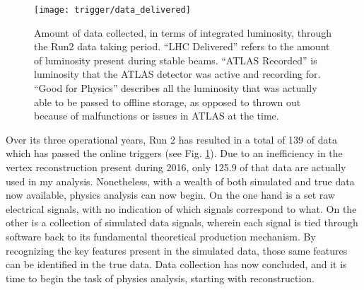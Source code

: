         \begin{figure}[h]
            \texttt{[image: trigger/data\_delivered]}
            \caption{Amount of data collected, in terms of integrated luminosity,
                through the Run2 data taking period\cite{data_quality}.
                ``LHC Delivered'' refers to the amount of luminosity present during stable beams.
                ``ATLAS Recorded'' is luminosity that the ATLAS detector was active and recording for.
                ``Good for Physics'' describes all the luminosity that was actually able to be passed to offline storage,
                    as opposed to thrown out because of malfunctions or issues in ATLAS at the time.
            }
            \label{fig:data_delivered}
        \end{figure}

        Over its three operational years, Run 2 has resulted in a total of 139 \ifb of data which has passed the online triggers
            (see Fig. \ref{fig:data_delivered}).
        Due to an inefficiency in the vertex reconstruction present during 2016,
            only 125.9 \ifb of that data are actually used in my analysis.
        Nonetheless, with a wealth of both simulated and true data now available, 
            physics analysis can now begin.
        On the one hand is a set raw electrical signals, with no indication of which signals correspond to what.
        On the other is a collection of simulated data signals,
            wherein each signal is tied through software back to its fundamental theoretical production mechanism.
        By recognizing the key features present in the simulated data,
            those same features can be identified in the true data.
        Data collection has now concluded, and it is time to begin the task of physics analysis,
            starting with reconstruction.
